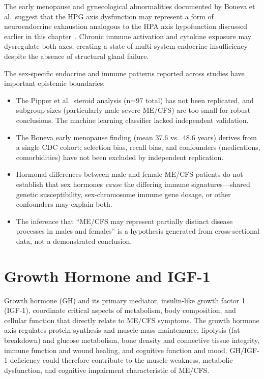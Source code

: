 The early menopause and gynecological abnormalities documented by Boneva et al.\ suggest that the HPG axis dysfunction may represent a form of neuroendocrine exhaustion analogous to the HPA axis hypofunction discussed earlier in this chapter~\cite{boneva2015menopause}. Chronic immune activation and cytokine exposure may dysregulate both axes, creating a state of multi-system endocrine insufficiency despite the absence of structural gland failure.

\begin{limitation}
The sex-specific endocrine and immune patterns reported across studies have important epistemic boundaries:
\begin{itemize}
    \item The Pipper et al.\ steroid analysis (n=97 total) has not been replicated, and subgroup sizes (particularly male severe ME/CFS) are too small for robust conclusions. The machine learning classifier lacked independent validation.
    \item The Boneva early menopause finding (mean 37.6 vs.\ 48.6 years) derives from a single CDC cohort; selection bias, recall bias, and confounders (medications, comorbidities) have not been excluded by independent replication.
    \item Hormonal differences between male and female ME/CFS patients do not establish that sex hormones \emph{cause} the differing immune signatures---shared genetic susceptibility, sex-chromosome immune gene dosage, or other confounders may explain both.
    \item The inference that ``ME/CFS may represent partially distinct disease processes in males and females'' is a hypothesis generated from cross-sectional data, not a demonstrated conclusion.
\end{itemize}
\end{limitation}

\section{Growth Hormone and IGF-1}
\label{sec:growth-hormone}

Growth hormone (GH) and its primary mediator, insulin-like growth factor 1 (IGF-1), coordinate critical aspects of metabolism, body composition, and cellular function that directly relate to ME/CFS symptoms. The growth hormone axis regulates protein synthesis and muscle mass maintenance, lipolysis (fat breakdown) and glucose metabolism, bone density and connective tissue integrity, immune function and wound healing, and cognitive function and mood. GH/IGF-1 deficiency could therefore contribute to the muscle weakness, metabolic dysfunction, and cognitive impairment characteristic of ME/CFS.

